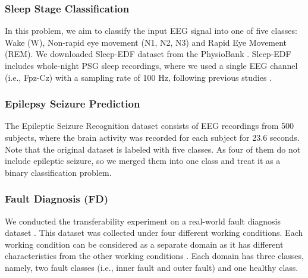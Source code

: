 \documentclass{article}
\begin{document}
\subsubsection{Sleep Stage Classification}
In this problem, we aim to classify the input EEG signal into one of five classes:  Wake (W), Non-rapid eye movement (N1, N2, N3) and Rapid Eye Movement (REM).
We downloaded Sleep-EDF dataset from the PhysioBank \cite{goldberger2000physiobank}. Sleep-EDF includes whole-night PSG sleep recordings, where we used a single EEG channel (i.e., Fpz-Cz) with a sampling rate of 100 Hz, following previous studies \cite{attnSleep_paper}.

\subsubsection{Epilepsy Seizure Prediction}
The Epileptic Seizure Recognition dataset \cite{PhysRevE.64.061907} consists of EEG recordings from 500 subjects, where the brain activity was recorded for each subject for 23.6 seconds. Note that the original dataset is labeled with five classes. As four of them do not include epileptic seizure, so we merged them into one class and treat it as a binary classification problem. 


\begin{table}[]
\centering
{}
\caption{Description of datasets used in our experiments. The details of FD is the same for all the 4 working conditions.}
\label{tab:data}
\end{table} 
\subsubsection{Fault Diagnosis (FD)}
We conducted the transferability experiment on a real-world fault diagnosis dataset \cite{lessmeier2016condition}. This dataset was collected under four different working conditions. Each working condition can be considered as a separate domain as it has different characteristics from the other working conditions \cite{ragab2020adversarial}.
Each domain has three classes, namely, two fault classes (i.e., inner fault and outer fault) and one healthy class. 
\end{document}
